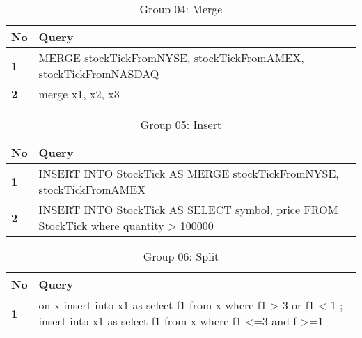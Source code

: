 \begin{table}[h]
\caption{Group 04: Merge}
\centering
\label{table:MergeTest}
\setlength\extrarowheight{5pt}
\begin{tabular}{||>{\centering\bfseries}m{0.5in}|>{\centering\arraybackslash}m{5in}||}
\hline
\textbf{No} & \textbf{Query} \\ \hline\hline
     1 & MERGE stockTickFromNYSE, stockTickFromAMEX, stockTickFromNASDAQ\\ \hline
      2 & merge x1, x2, x3\\ \hline
     				           				
 \end{tabular}
\end{table}


\begin{table}[h]
\caption{Group 05: Insert}
\centering
\label{table:InsertTest}
\setlength\extrarowheight{5pt}
\begin{tabular}{||>{\centering\bfseries}m{0.5in}|>{\centering\arraybackslash}m{5in}||}
\hline
\textbf{No} & \textbf{Query} \\ \hline\hline
     1 & INSERT INTO StockTick AS MERGE stockTickFromNYSE, stockTickFromAMEX \\ \hline
       2 & INSERT INTO StockTick AS SELECT symbol, price FROM StockTick where quantity > 100000 \\ \hline
   
     				           				
 \end{tabular}
\end{table}


\begin{table}[h]
\caption{Group 06: Split}
\centering
\label{table:Split Test}
\setlength\extrarowheight{5pt}
\begin{tabular}{||>{\centering\bfseries}m{0.5in}|>{\centering\arraybackslash}m{5in}||}
\hline
\textbf{No} & \textbf{Query} \\ \hline\hline
     			      1 & on x insert into x1 as select f1 from x where f1 > 3 or f1 < 1 ; insert into x1  as select f1 from x where f1 <=3 and f >=1\\ \hline
	           				
 \end{tabular}
\end{table}






